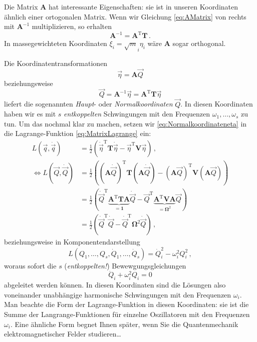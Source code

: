 \documentclass[paper=a4, fontsize=11.0pt, abstractoff, DIV12]{scrartcl}
\begin{document}
Die Matrix $\mathbf{A}$ hat interessante Eigenschaften: sie ist in unseren
Koordinaten ähnlich einer ortogonalen Matrix. Wenn wir Gleichung
\eqref{eq:AMatrix} von rechts mit $\mathbf{A}^{-1}$ multiplizieren, so erhalten
\begin{equation}
\mathbf{A}^{-1} = \mathbf{A}^\mathrm{T}\mathbf{T}\,.
\label{eq:Ainverse}
\end{equation}
In massegewichteten Koordinaten $\xi_i = \sqrt{m}_i \eta_i$ wäre $\mathbf{A}$
sogar orthogonal.

Die Koordinatentransformationen
\begin{equation}
\vec \eta = \mathbf{A}\vec{Q}
\label{eq:Normalkoordinateneta}
\end{equation}
beziehungsweise
\begin{equation}
\vec Q = \mathbf{A}^{-1}\vec \eta = \mathbf{A}^{\mathrm{T}}\mathbf{T}\vec \eta
\label{eq:Normalkoordinaten}
\end{equation}
liefert die sogenannten \emph{Haupt}- oder \emph{Normalkoordinaten} $\vec{Q}$.
In diesen Koordinaten haben wir es mit $s$ \emph{entkoppelten}
Schwingungen mit den Frequenzen $\omega_1, \dots, \omega_s$ zu tun. Um das
nochmal klar zu machen, setzen wir \eqref{eq:Normalkoordinateneta} in die
Lagrange-Funktion \eqref{eq:MatrixLagrange} ein:
\begin{align}
L(\vec q, \dot{\vec q}) &= \frac{1}{2}\left(\dot{\vec{\eta}}^\mathrm{T}\mathbf{T}\dot{\vec{\eta}} - \vec{\eta}^\mathrm{T}\mathbf{V}\vec{\eta}\right)\,,\nonumber\\
\Leftrightarrow L(\vec Q, \dot{\vec Q}) &= \frac{1}{2}\left( (\mathbf{A}\dot{\vec Q})^\mathrm{T}\mathbf{T}(\mathbf{A}\dot{\vec Q}) - (\mathbf{A}{\vec Q})^\mathrm{T}\mathbf{V}(\mathbf{A}{\vec Q}) \right) \nonumber\\
&= \frac{1}{2}\left(\dot{\vec{Q}}^\mathrm{T}\underbrace{\mathbf{A}^\mathrm{T}\mathbf{T}\mathbf{A}}_{=\mathbf{1}}\dot{\vec{Q}} - \vec{Q}^\mathrm{T}\underbrace{\mathbf{A}^\mathrm{T}\mathbf{V}\mathbf{A}}_{=\mathbf{\Omega}^2}\vec{Q}\right)\nonumber\\
&= \frac{1}{2}\left(\dot{\vec{Q}}^\mathrm{T}\dot{\vec Q} - \dot{\vec{Q}}^\mathrm{T}\mathbf{\Omega}^2\dot{\vec Q}\right)\,,
\end{align}
beziehungsweise in Komponentendarstellung
\begin{equation}
L(Q_1,\dots,Q_s, \dot{Q}_1,\dots,\dot{Q}_s) = \dot{Q}_i^2 - \omega_i^2 Q_i^2\, ,
\end{equation}
woraus sofort die $s$ (\emph{entkoppelten!}) Bewewgungsgleichungen
\begin{equation}
\ddot{Q}_i + \omega_i^2 Q_i = 0
\end{equation}
abgeleitet werden können. In diesen Koordinaten sind die Lösungen also
voneinander unabhängige harmonische Schwingungen mit den Frequenzen
$\omega_i$. Man beachte die Form der Lagrange-Funktion in diesen Koordinaten:
sie ist die Summe der Langrange-Funktionen für einzelne Oszillatoren mit
den Frequenzen $\omega_i$. Eine ähnliche Form begnet Ihnen später, wenn Sie die
Quantenmechanik elektromagnetischer Felder studieren\dots
\end{document}
